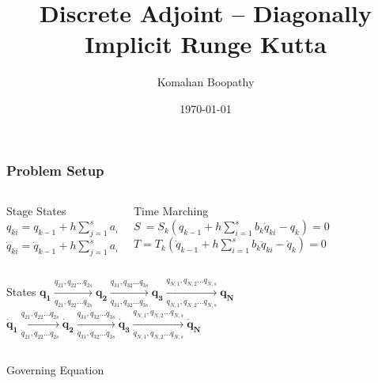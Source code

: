 \documentclass{beamer}
\title[\hspace{-0.2cm} DIRK Adjoint]
{
Discrete Adjoint -- Diagonally Implicit Runge Kutta
}
\author[Komahan Boopathy]
{
  \Large {Komahan Boopathy}\\
}
\institute
{
  \large Georgia Institute of Technology\\
 School of Aerospace Engineering\\
 Atlanta, GA
}
\date
{
\small \today
}
\begin{document}
\begin{frame}
  \titlepage
\end{frame}


\begin{frame}[allowframebreaks] \frametitle{Problem Setup}

  \begin{columns}[T] %
    \begin{column}{.42\textwidth}
      \begin{block}{Stage States}\medskip
        ${q_{ki}} = q_{k-1} + h \sum_{j=1}^s a_{ij} \dot{q}_{kj}$\\
        ${\dot{q}_{ki}} = \dot{q}_{k-1} + h \sum_{j=1}^s a_{ij} \ddot{q}_{kj}$
      \end{block}
    \end{column}%
    \hfill
    \begin{column}{.58\textwidth}
      \begin{block}{Time Marching}\medskip
        $S ~= S_k(q_{k-1} + h \sum_{i=1}^s b_k \dot{q}_{ki} - q_{k})  = 0$
        $T=T_k(\dot{q}_{k-1} + h \sum_{i=1}^s b_k \ddot{q}_{ki} - \dot{q}_{k})  = 0$
      \end{block}
    \end{column}%
  \end{columns}
  \medskip
  \begin{block}{States}\centering
    $\mathbf{q_1} \xrightarrow[\dot{q}_{21},\dot{q}_{22}\ldots\dot{q}_{2s}]{q_{21},q_{22}\ldots q_{2s}} \mathbf{q_2} \xrightarrow[\dot{q}_{31},\dot{q}_{32}\ldots\dot{q}_{3s}]{q_{31},q_{32}\ldots q_{3s}} \mathbf{q_3} \xrightarrow[\dot{q}_{N,1},\dot{q}_{N,2}\ldots\dot{q}_{N,s}]{q_{N,1},q_{N,2}\ldots q_{N,s}} \mathbf{q_N}$
    $\mathbf{\dot{q}_1} \xrightarrow[\ddot{q}_{21},\ddot{q}_{22}\ldots\ddot{q}_{2s}]{\dot{q}_{21},\dot{q}_{22}\ldots \dot{q}_{2s}} \mathbf{\dot{q}_2} \xrightarrow[\ddot{q}_{31},\ddot{q}_{32}\ldots\ddot{q}_{3s}]{\dot{q}_{31},\dot{q}_{32}\ldots \dot{q}_{3s}} \mathbf{\dot{q}_3} \xrightarrow[\ddot{q}_{N,1},\ddot{q}_{N,2}\ldots\ddot{q}_{N,s}]{\dot{q}_{N,1},\dot{q}_{N,2}\ldots \dot{q}_{N,s}} \mathbf{\dot{q}_N}$
  \end{block}
  \medskip
  \begin{columns}[T] %
    \begin{column}{.42\textwidth}
      \begin{block}{Governing Equation}\centering

\end{block}
\end{column}
\end{columns}
\end{frame}
\end{document}
